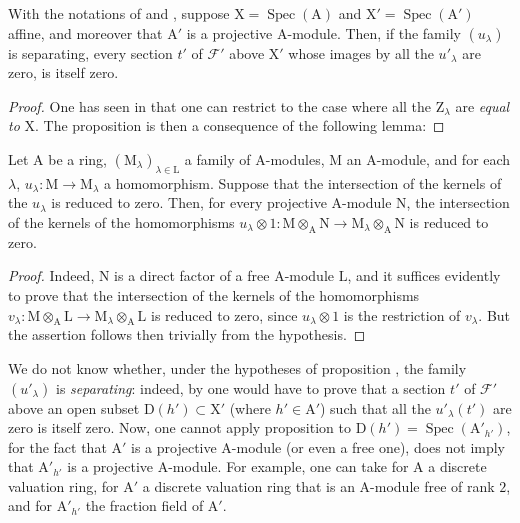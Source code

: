 \begin{proposition}[11.9.7]
\label{IV.11.9.7}
With the notations of  and , suppose $\mathrm{X}=\operatorname{Spec}(\mathrm{A})$ and $\mathrm{X}'=\operatorname{Spec}(\mathrm{A}')$ affine, and moreover that $\mathrm{A}'$ is a projective $\mathrm{A}$-module.
Then, if the family $(u_\lambda)$ is separating, every section $t'$ of $\mathscr{F}'$ above $\mathrm{X}'$ whose images by all the $u'_\lambda$ are zero, is itself zero.
\end{proposition}

\begin{proof}
One has seen in  that one can restrict to the case where all the $\mathrm{Z}_\lambda$ are \emph{equal to} $\mathrm{X}$.
The proposition is then a consequence of the following lemma:
\end{proof}

\begin{lemma}[11.9.7.1]
\label{IV.11.9.7.1}
Let $\mathrm{A}$ be a ring, $(\mathrm{M}_\lambda)_{\lambda\in\mathrm{L}}$ a family of $\mathrm{A}$-modules, $\mathrm{M}$ an $\mathrm{A}$-module, and for each $\lambda$, $u_\lambda:\mathrm{M}\to\mathrm{M}_\lambda$ a homomorphism.
Suppose that the intersection of the kernels of the $u_\lambda$ is reduced to zero.
Then, for every projective $\mathrm{A}$-module $\mathrm{N}$, the intersection of the kernels of the homomorphisms $u_\lambda\otimes 1:\mathrm{M}\otimes_\mathrm{A}\mathrm{N}\to\mathrm{M}_\lambda\otimes_\mathrm{A}\mathrm{N}$ is reduced to zero.
\end{lemma}

\begin{proof}
Indeed, $\mathrm{N}$ is a direct factor of a free $\mathrm{A}$-module $\mathrm{L}$, and it suffices evidently to prove that the intersection of the kernels of the homomorphisms $v_\lambda:\mathrm{M}\otimes_\mathrm{A}\mathrm{L}\to\mathrm{M}_\lambda\otimes_\mathrm{A}\mathrm{L}$ is reduced to zero, since $u_\lambda\otimes 1$ is the restriction of $v_\lambda$.
But the assertion follows then trivially from the hypothesis.
\end{proof}

\begin{remarks}[11.9.8]
\label{IV.11.9.8}
We do not know whether, under the hypotheses of proposition , the family $(u'_\lambda)$ is \emph{separating}: indeed, by  one would have to prove that a section $t'$ of $\mathscr{F}'$ above an open subset $\mathrm{D}(h')\subset\mathrm{X}'$ (where $h'\in\mathrm{A}'$) such that all the $u'_\lambda(t')$ are zero is itself zero.
Now, one cannot apply proposition  to $\mathrm{D}(h')=\operatorname{Spec}(\mathrm{A}'_{h'})$, for the fact that $\mathrm{A}'$ is a projective $\mathrm{A}$-module (or even a free one), does not imply that $\mathrm{A}'_{h'}$ is a projective $\mathrm{A}$-module.
For example, one can take for $\mathrm{A}$ a discrete valuation ring, for $\mathrm{A}'$ a discrete valuation ring that is an $\mathrm{A}$-module free of rank $2$, and for $\mathrm{A}'_{h'}$ the fraction field of $\mathrm{A}'$.
\end{remarks}

